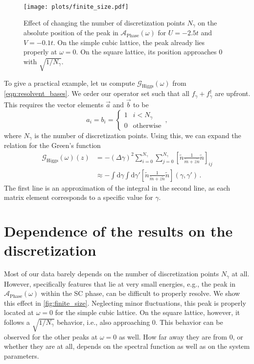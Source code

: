 \documentclass[
    reprint, 
    aps,
    preprintnumbers,
    twocolumn,
    prb,
    superscriptaddress
]{revtex4-2}
\newcommand{\dgamma}{\mathrm{d}\gamma}
\newcommand{\greens}[1]{\mathcal{G}_\text{#1} (\omega)}
\newcommand{\spectral}[1]{\mathcal{A}_\text{#1}  (\omega)}
\begin{document}
\begin{figure}
    \centering
    \texttt{[image: plots/finite\_size.pdf]}
    \caption{Effect of changing the number of discretization points $N_\gamma$ on the absolute position of the peak in $\spectral{Phase}$ for $U=-2.5t$ and $V=-0.1t$.
    On the simple cubic lattice, the peak already lies properly at $\omega=0$.
    On the square lattice, its position approaches $0$ with $\sqrt{1/N_\gamma}$.}
    \label{fig:finite_size}
\end{figure}

To give a practical example, let us compute $\greens{Higgs}$ from \eqref{eqn:resolvent_bases}.
We order our operator set such that all $f_\gamma + f_\gamma^{\dagger}$ are upfront. 
This requires the vector elements $\vec{a}$ and $\vec{b}$ to be
\begin{equation}
    a_i = b_i = \begin{cases}
        1 & i < N_\gamma \\
        0 & \text{otherwise}
    \end{cases}\,,
\end{equation}
where $N_\gamma$ is the number of discretization points.
Using this, we can expand the relation for the Green's function
\begin{align}
    \greens{Higgs} (z) &= -(\Delta \gamma)^2 \sum_{i=0}^{N_\gamma} \sum_{j=0}^{N_\gamma} \left[ \tilde{n} \frac{1}{\tilde{m} + z \tilde{n}} \tilde{n} \right]_{ij} \nonumber \\
        &\approx - \int \dgamma \int \dgamma' \left[ \tilde{n} \frac{1}{\tilde{m} + z \tilde{n}} \tilde{n} \right](\gamma, \gamma')\,.
\end{align}
The first line is an approximation of the integral in the second line, as each matrix element corresponds to a specific value for $\gamma$.

\section{Dependence of the results on the discretization}
\label{sec:finite_size}

Most of our data barely depends on the number of discretization points $N_\gamma$ at all.
However, specifically features that lie at very small energies, e.g., the peak in $\spectral{Phase}$ within the SC phase, can be difficult to properly resolve.
We show this effect in \autoref{fig:finite_size}.
Neglecting minor fluctuations, this peak is properly located at $\omega=0$ for the simple cubic lattice.
On the square lattice, however, it follows a $\sqrt{1/N_\gamma}$ behavior, i.e., also approaching $0$.
This behavior can be observed for the other peaks at $\omega=0$ as well.
How far away they are from $0$, or whether they are at all, depends on the spectral function as well as on the system parameters.


%
		
\end{document}
